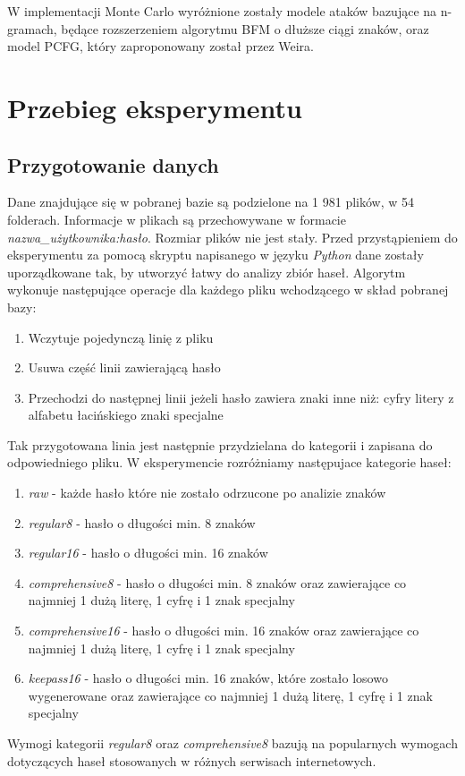 \documentclass{article}
\begin{document}
	W implementacji Monte Carlo \cite{montecarloimplementation} wyróżnione zostały modele ataków bazujące na n-gramach, będące rozszerzeniem algorytmu BFM o dłuższe ciągi znaków, oraz model PCFG, który zaproponowany został przez Weira.

	\newpage
	\section{Przebieg eksperymentu}
	\subsection{Przygotowanie danych}
	Dane znajdujące się w pobranej bazie są podzielone na 1 981 plików, w 54 folderach. Informacje w plikach są przechowywane w formacie \textit{nazwa\_użytkownika:hasło}. Rozmiar plików nie jest stały. Przed przystąpieniem do eksperymentu za pomocą skryptu napisanego w języku \textit{Python} dane zostały uporządkowane tak, by utworzyć łatwy do analizy zbiór haseł. Algorytm wykonuje następujące operacje dla każdego pliku wchodzącego w skład pobranej bazy:
	\begin{enumerate}
		\item Wczytuje pojedynczą linię z pliku
		\item Usuwa część linii zawierającą hasło
		\item Przechodzi do następnej linii jeżeli hasło zawiera znaki inne niż:
			\subitem cyfry
			\subitem litery z alfabetu łacińskiego
			\subitem znaki specjalne	
	\end{enumerate}	
	Tak przygotowana linia jest następnie przydzielana do kategorii i zapisana do odpowiedniego pliku. W eksperymencie rozróżniamy następujace kategorie haseł:
	\begin{enumerate}
		\item \textit{raw} - każde hasło które nie zostało odrzucone po analizie znaków
		\item \textit{regular8} - hasło o długości min. 8 znaków
		\item \textit{regular16} - hasło o długości min. 16 znaków
		\item \textit{comprehensive8} - hasło o długości min. 8 znaków oraz zawierające co najmniej 1 dużą literę, 1 cyfrę i 1 znak specjalny
		\item \textit{comprehensive16} - hasło o długości min. 16 znaków oraz zawierające co najmniej 1 dużą literę, 1 cyfrę i 1 znak specjalny
		\item \textit{keepass16} - hasło o długości min. 16 znaków, które zostało losowo wygenerowane oraz zawierające co najmniej 1 dużą literę, 1 cyfrę i 1 znak specjalny
	\end{enumerate}
	Wymogi kategorii \textit{regular8} oraz \textit{comprehensive8} bazują na popularnych wymogach dotyczących haseł stosowanych w różnych serwisach internetowych. 
	
\end{document}
